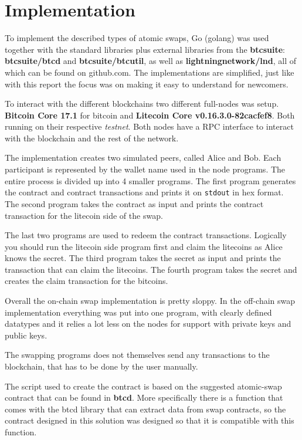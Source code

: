 \chapter{Implementation}
To implement the described types of atomic swaps, Go (golang) was used 
together with the standard libraries plus external libraries from the 
\textbf{btcsuite}: \textbf{btcsuite/btcd} and \textbf{btcsuite/btcutil}, 
as well as \textbf{lightningnetwork/lnd}, all of which can be found 
on github.com. The implementations are simplified, just like with 
this report the focus was on making it easy to understand for newcomers. 

To interact with the different blockchains two different full-nodes 
was setup. \textbf{Bitcoin Core 17.1} for bitcoin and 
\textbf{Litecoin Core  v0.16.3.0-82cacfef8}. Both running on their 
respective \textit{testnet}. Both nodes have a RPC interface to interact 
with the blockchain and the rest of the network. 

The implementation creates two simulated peers, called Alice and Bob. 
Each participant is represented by the wallet name used in the node
programs. The entire process is divided up into 4 smaller programs.
The first program generates the contract and contract transactions and 
prints it on \texttt{stdout} in hex format. The second program takes 
the contract as input and prints the contract transaction for the 
litecoin side of the swap. 

The last two programs are used to redeem the contract transactions.
Logically you should run the litecoin side program first and
claim the litecoins as Alice knows the secret. The third program
takes the secret as input and prints the transaction that can
claim the litecoins. The fourth program takes the secret and creates 
the claim transaction for the bitcoins. 

Overall the on-chain swap implementation is pretty sloppy. 
In the off-chain swap implementation everything was put into one program, with 
clearly defined datatypes and it relies a lot less on the nodes for support 
with private keys and public keys.

The swapping programs does not themselves send any transactions to the blockchain,
that has to be done by the user manually. 

The script used to create the contract is based on the suggested atomic-swap 
contract that can be found in \textbf{btcd}. More specifically there 
is a function that comes with the btcd library that can extract data from 
swap contracts, so the contract designed in this solution was designed so that
it is compatible with this function. 

